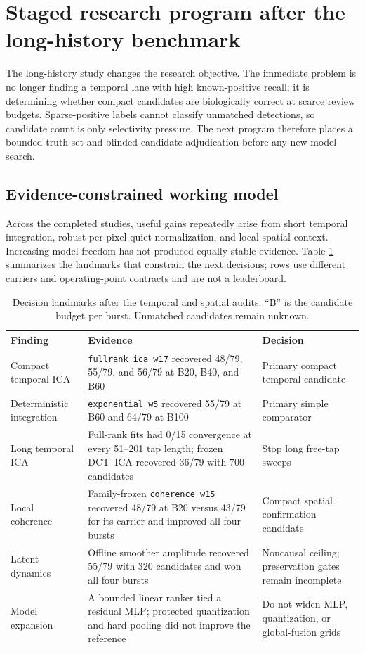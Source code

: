 \section{Staged research program after the long-history benchmark}
\label{sec:research-program}

The long-history study changes the research objective. The immediate problem
is no longer finding a temporal lane with high known-positive recall; it is
determining whether compact candidates are biologically correct at scarce
review budgets. Sparse-positive labels cannot classify unmatched detections,
so candidate count is only selectivity pressure. The next program therefore
places a bounded truth-set and blinded candidate adjudication before any new
model search.

\subsection{Evidence-constrained working model}

Across the completed studies, useful gains repeatedly arise from short temporal
integration, robust per-pixel quiet normalization, and local spatial context.
Increasing model freedom has not produced equally stable evidence. Table
\ref{tab:frontier} summarizes the landmarks that constrain the next decisions;
rows use different carriers and operating-point contracts and are not a
leaderboard.

\begin{table}[t]
\centering
\small
\caption{Decision landmarks after the temporal and spatial audits. ``B'' is
the candidate budget per burst. Unmatched candidates remain unknown.}
\label{tab:frontier}
\begin{tabular}{p{.24\linewidth}p{.42\linewidth}p{.25\linewidth}}
\toprule
Finding & Evidence & Decision \\
\midrule
Compact temporal ICA & \texttt{fullrank\_ica\_w17} recovered 48/79, 55/79,
and 56/79 at B20, B40, and B60 & Primary compact temporal candidate \\
Deterministic integration & \texttt{exponential\_w5} recovered 55/79 at B60
and 64/79 at B100 & Primary simple comparator \\
Long temporal ICA & Full-rank fits had 0/15 convergence at every 51--201 tap
length; frozen DCT--ICA recovered 36/79 with 700 candidates & Stop long free-tap
sweeps \\
Local coherence & Family-frozen \texttt{coherence\_w15} recovered 48/79 at
B20 versus 43/79 for its carrier and improved all four bursts & Compact spatial
confirmation candidate \\
Latent dynamics & Offline smoother amplitude recovered 55/79 with 320
candidates and won all four bursts & Noncausal ceiling; preservation gates
remain incomplete \\
Model expansion & A bounded linear ranker tied a residual MLP; protected
quantization and hard pooling did not improve the reference & Do not widen MLP,
quantization, or global-fusion grids \\
\bottomrule
\end{tabular}
\end{table}

